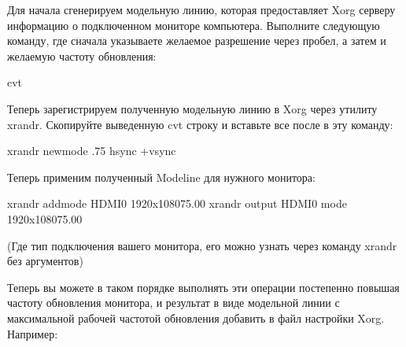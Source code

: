 \documentclass[letterpaper,10pt,russian,openany]{sphinxmanual}
\begin{document}
\sphinxAtStartPar
Для начала сгенерируем модельную линию, которая предоставляет Xorg серверу информацию о подключенном мониторе компьютера.
Выполните следующую команду, где сначала указываете желаемое разрешение через пробел, а затем и желаемую частоту обновления:

\begin{sphinxVerbatim}[commandchars=\\\{\}]
cvt   
\end{sphinxVerbatim}

\sphinxAtStartPar
Теперь зарегистрируем полученную модельную линию в Xorg через утилиту xrandr.
Скопируйте выведенную cvt строку и вставьте все после  в эту команду:

\begin{sphinxVerbatim}[commandchars=\\\{\}]
xrandr \PYGZhy{}\PYGZhy{}newmode   .75           \PYGZhy{}hsync +vsync
\end{sphinxVerbatim}

\sphinxAtStartPar
Теперь применим полученный Modeline для нужного монитора:

\begin{sphinxVerbatim}[commandchars=\\\{\}]
xrandr \PYGZhy{}\PYGZhy{}addmode HDMI\PYGZhy{}0 1920x1080\PYGZus{}75.00
xrandr \PYGZhy{}\PYGZhy{}output HDMI\PYGZhy{}0 \PYGZhy{}\PYGZhy{}mode 1920x1080\PYGZus{}75.00
\end{sphinxVerbatim}

\sphinxAtStartPar
(Где  \sphinxhyphen{} тип подключения вашего монитора, его можно узнать через команду xrandr без аргументов)

\sphinxAtStartPar
Теперь вы можете в таком порядке выполнять эти операции постепенно повышая частоту обновления монитора, и результат в виде
модельной линии с максимальной рабочей частотой обновления добавить в файл настройки Xorg. Например:
\end{document}

